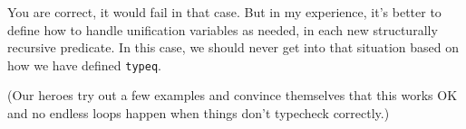 \heroADVISOR{} You are correct, it would fail in that case. But in my
experience, it's better to define how to handle unification variables as
needed, in each new structurally recursive predicate. In this case, we
should never get into that situation based on how we have defined
\texttt{typeq}.

\begin{scenecomment}
(Our heroes try out a few examples and convince themselves that this works OK and no endless loops happen when things don't typecheck correctly.)
\end{scenecomment}
